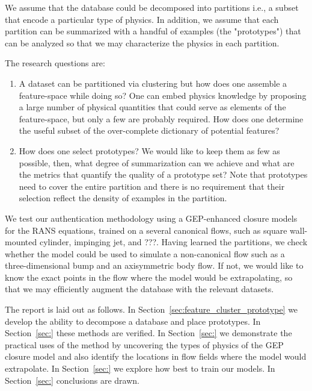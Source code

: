We assume that the database could be decomposed into partitions i.e., a subset that encode a particular type of physics. In addition, we assume that each partition can be summarized with a handful of examples (the "prototypes") that can be analyzed so that we may characterize the physics in each partition.

The research questions are:
\begin{enumerate}
    \item A dataset can be partitioned via clustering but how does one assemble a feature-space while doing so? One can embed physics knowledge by proposing a large number of physical quantities that could serve as elements of the feature-space, but only a few are probably required. How does one determine the useful subset of the over-complete dictionary of potential features?
    \item How does one select prototypes? We would like to keep them as few as possible, then, what degree of summarization can we achieve and what are the metrics that quantify the quality of a prototype set? Note that prototypes need to cover the entire partition and there is no requirement that their selection reﬂect the density of examples in the partition.
\end{enumerate}
%
We test our authentication methodology using a GEP-enhanced closure models for the RANS equations, trained on a several canonical flows, such as square wall-mounted cylinder, impinging jet, and ???. Having learned the partitions, we check whether the model could be used to simulate a non-canonical flow such as a three-dimensional bump and an axisymmetric body flow. If not, we would like to know the exact points in the ﬂow where the model would be extrapolating, so that we may efﬁciently augment the database with the relevant datasets.


The report is laid out as follows. In Section~\ref{sec:feature_cluster_prototype} we develop the ability to decompose a database and place prototypes. In Section~\ref{sec:} these methods are veriﬁed. In Section~\ref{sec:} we demonstrate the practical uses of the method by uncovering the types of physics of the GEP closure model and also identify the locations in ﬂow fields where the model would extrapolate. In Section~\ref{sec:} we explore how best to train our models. In Section~\ref{sec:} conclusions are drawn.

